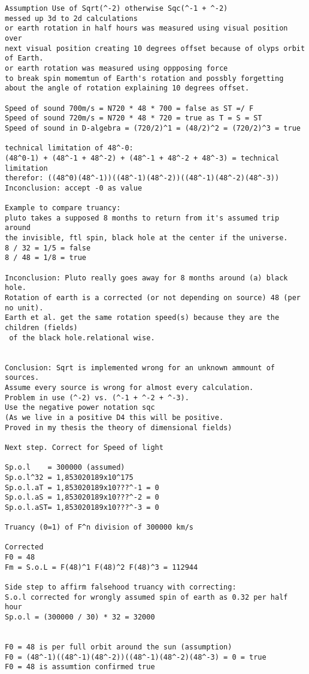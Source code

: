 \documentclass{thesis}
\begin{document}
\begin{verbatim}
Assumption Use of Sqrt(^-2) otherwise Sqc(^-1 + ^-2) 
messed up 3d to 2d calculations 
or earth rotation in half hours was measured using visual position over 
next visual position creating 10 degrees offset because of olyps orbit of Earth.
or earth rotation was measured using oppposing force
to break spin momemtun of Earth's rotation and possbly forgetting 
about the angle of rotation explaining 10 degrees offset.

Speed of sound 700m/s = N720 * 48 * 700 = false as ST =/ F
Speed of sound 720m/s = N720 * 48 * 720 = true as T = S = ST 
Speed of sound in D-algebra = (720/2)^1 = (48/2)^2 = (720/2)^3 = true

technical limitation of 48^-0: 
(48^0-1) + (48^-1 + 48^-2) + (48^-1 + 48^-2 + 48^-3) = technical limitation
therefor: ((48^0)(48^-1))((48^-1)(48^-2))((48^-1)(48^-2)(48^-3))
Inconclusion: accept -0 as value

Example to compare truancy:
pluto takes a supposed 8 months to return from it's assumed trip around 
the invisible, ftl spin, black hole at the center if the universe.
8 / 32 = 1/5 = false
8 / 48 = 1/8 = true

Inconclusion: Pluto really goes away for 8 months around (a) black hole.
Rotation of earth is a corrected (or not depending on source) 48 (per no unit).
Earth et al. get the same rotation speed(s) because they are the children (fields)
 of the black hole.relational wise.


Conclusion: Sqrt is implemented wrong for an unknown ammount of sources. 
Assume every source is wrong for almost every calculation.
Problem in use (^-2) vs. (^-1 + ^-2 + ^-3). 
Use the negative power notation sqc 
(As we live in a positive D4 this will be positive. 
Proved in my thesis the theory of dimensional fields)

Next step. Correct for Speed of light
 
Sp.o.l    = 300000 (assumed)
Sp.o.l^32 = 1,853020189x10^175
Sp.o.l.aT = 1,853020189x10???^-1 = 0
Sp.o.l.aS = 1,853020189x10???^-2 = 0
Sp.o.l.aST= 1,853020189x10???^-3 = 0

Truancy (0=1) of F^n division of 300000 km/s

Corrected
F0 = 48
Fm = S.o.L = F(48)^1 F(48)^2 F(48)^3 = 112944

Side step to affirm falsehood truancy with correcting:
S.o.l corrected for wrongly assumed spin of earth as 0.32 per half hour
Sp.o.l = (300000 / 30) * 32 = 32000


F0 = 48 is per full orbit around the sun (assumption)
F0 = (48^-1)((48^-1)(48^-2))((48^-1)(48^-2)(48^-3) = 0 = true
F0 = 48 is assumtion confirmed true



\end{verbatim}
\end{document}
